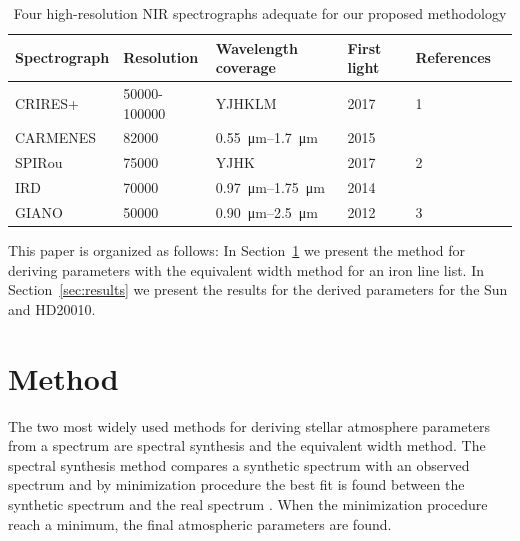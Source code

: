 \documentclass{aa}
\begin{document}
\begin{table}[tb!]
    \caption{Four high-resolution NIR spectrographs adequate for our proposed
        methodology}
    \label{tab:spectrograph}
    \centering
    \begin{tabular}{llllll}
      \hline\hline
        Spectrograph & Resolution   & Wavelength coverage               & First light & References \\
      \hline
        CRIRES+      & 50000-100000 & YJHKLM                            & 2017        & 1 \\
        CARMENES     & 82000        & \SIrange{0.55}{1.7}{\micro\meter} & 2015        & \cite{CARMENES} \\
        SPIRou       & 75000        & YJHK                              & 2017        & 2 \\
        IRD          & 70000        & \SIrange{0.97}{1.75}{\micro\meter}& 2014        & \cite{IRD} \\
        GIANO        & 50000        & \SIrange{0.90}{2.5}{\micro\meter} & 2012        & 3 \\
      \hline
    \end{tabular}
\end{table}

This paper is organized as follows: In Section~\ref{sec:method} we
present the method for deriving parameters with the equivalent width
method for an iron line list. In Section~\ref{sec:results} we present
the results for the derived parameters for the Sun and HD20010.





\section{Method}
\label{sec:method}

The two most widely used methods for deriving stellar atmosphere
parameters from a spectrum are spectral synthesis and the equivalent
width method. The spectral synthesis method compares a synthetic
spectrum with an observed spectrum and by minimization procedure the
best fit is found between the synthetic spectrum and the real spectrum
\citep[see e.g.][]{Onehag2012}. When the minimization procedure reach a
minimum, the final atmospheric parameters are found.
\end{document}
